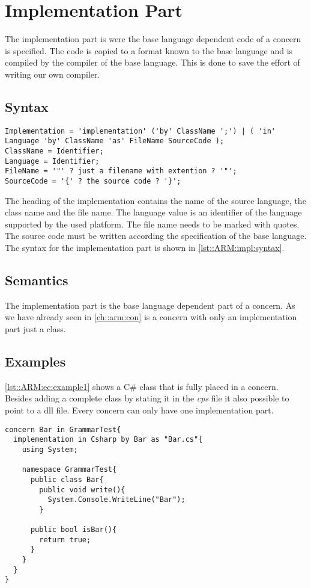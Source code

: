 \chapter{Implementation Part} \label{chapter:implementation}
The implementation part is were the base language dependent code of a concern is specified. 
The code is copied to a format known to the base language and is compiled by the compiler of the base language.
This is done to save the effort of writing our own compiler.

\section{Syntax}
\begin{lstlisting}[caption = {Implementation syntax}, label = lst::ARM:impl:syntax, style = listing, language = ebnf, float = tpb]
Implementation = 'implementation' ('by' ClassName ';') | ( 'in' Language 'by' ClassName 'as' FileName SourceCode );
ClassName = Identifier;
Language = Identifier;
FileName = '"' ? just a filename with extention ? '"';
SourceCode = '{' ? the source code ? '}';
\end{lstlisting}
The heading of the implementation contains the name of the source language, the class name and the file name.
The language value is an identifier of the language supported by the used platform.
The file name needs to be marked with quotes.
The source code must be written according the specification of the base language. 
The \Compose* syntax for the implementation part is shown in \autoref{lst::ARM:impl:syntax}.

\section{Semantics}
The implementation part is the base language dependent part of a concern. 
As we have already seen in \autoref{ch::arm:con} is a concern with only an implementation part just a class.

\section{Examples}
\autoref{lst::ARM:ec:example1} shows a C\# class that is fully placed in a concern.
Besides adding a complete class by stating it in the \emph{cps} file it also possible to point to a dll file.
Every concern can only have one implementation part.

\begin{lstlisting}[caption={The class Bar as concern},label=lst::ARM:ec:example1, style=listing,language=ComposeStar,float = tpb]
concern Bar in GrammarTest{
  implementation in Csharp by Bar as "Bar.cs"{
    using System;
    
    namespace GrammarTest{
      public class Bar{
        public void write(){
          System.Console.WriteLine("Bar");
        }

      public bool isBar(){
        return true;
      }
    }
  }
}
\end{lstlisting}

